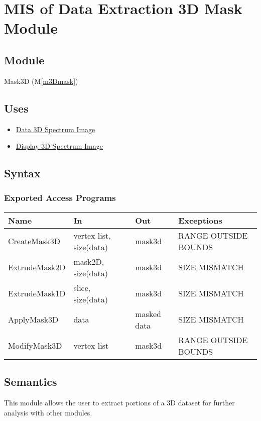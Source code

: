 \documentclass[12pt, titlepage]{article}
\newcommand{\mref}[1]{M\ref{#1}}
\begin{document}
\newpage
\section{MIS of Data Extraction 3D Mask Module} \label{Mod:Mask3D}

\subsection{Module}

Mask3D (\mref{m3Dmask})

\subsection{Uses}
\begin{itemize}
    \item \hyperref[Mod:SI]{Data 3D Spectrum Image}
    \item \hyperref[Mod:Disp3D]{Display 3D Spectrum Image}
\end{itemize}

\subsection{Syntax}

\subsubsection{Exported Access Programs}

\begin{center}
    \begin{tabular}{p{3cm} p{4cm} p{4cm} p{4cm}}
        \hline
        \textbf{Name} & \textbf{In} & \textbf{Out} & \textbf{Exceptions} \\
        \hline
        CreateMask3D & vertex list, size(data) & mask3d & RANGE OUTSIDE BOUNDS \\
        ExtrudeMask2D & mask2D, size(data) & mask3d & SIZE MISMATCH \\
        ExtrudeMask1D & slice, size(data) & mask3d & SIZE MISMATCH \\
        ApplyMask3D & data & masked data & SIZE MISMATCH \\
        ModifyMask3D & vertex list & mask3d & RANGE OUTSIDE BOUNDS \\
        \hline
    \end{tabular}
\end{center}

\subsection{Semantics}
This module allows the user to extract portions of a 3D dataset for further
analysis with other modules.
\end{document}
